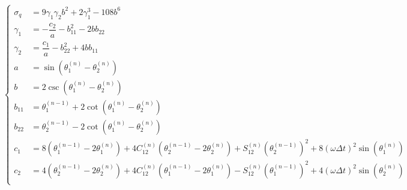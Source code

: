 \documentclass[UTF8]{ctexart}
\begin{document}
\begin{equation}
\begin{cases}
						\sigma_q              & = 9\gamma_{1} \gamma_{2} b^{2} + 2 \gamma_{1}^{3} - 108 b^{6}                                                                                                                                                                                                   \\
						\gamma_{1}            & = - \dfrac{c_{2}}{a} - b_{11}^{2} - 2 b b_{22}                                                                                                                                                                                                                  \\
						\gamma_{2}            & =   \dfrac{c_{1}}{a} - b_{22}^{2} + 4 b b_{11}                                                                                                                                                                                                                  \\
						a                     & = \sin(\theta_{1}^{(n)} - \theta_2^{(n)})                                                                                                                                                                                                                       \\
						b                     & = 2 \csc(\theta_{1}^{(n)} - \theta_2^{(n)})                                                                                                                                                                                                                     \\
						b_{11}                & = \theta_{1}^{(n-1)} + 2 \cot(\theta_{1}^{(n)} - \theta_2^{(n)})                                                                                                                                                                                                \\
						b_{22}                & = \theta_{2}^{(n-1)} - 2 \cot(\theta_{1}^{(n)} - \theta_2^{(n)})                                                                                                                                                                                                \\
						c_{1}                 & = 8 \left(\theta_{1}^{(n - 1)} - 2 \theta_{1}^{(n)}\right) + 4 C_{12}^{(n)} \left(\theta_{2}^{(n - 1)} - 2 \theta_{2}^{(n)}\right) + S_{12}^{(n)} \left(\theta_{2}^{(n - 1)}\right)^2 + 8 \left(\omega \Delta t\right)^{2} \sin\left(\theta_{1}^{(n)}\right)    \\
						c_{2}                 & = 4 \left(\theta_{2}^{(n - 1)} - 2 \theta_{2}^{(n)}\right) + 4 C_{12}^{(n)} \left(\theta_{1}^{(n - 1)} - 2 \theta_{1}^{(n)}\right) - S_{12}^{(n)} \left(\theta_{1}^{(n - 1)}\right)^2 + 4 \left(\omega \Delta t\right)^{2} \sin\left(\theta_{2}^{(n)}\right)    \\
					\end{cases}
				\end{equation}
\end{document}
